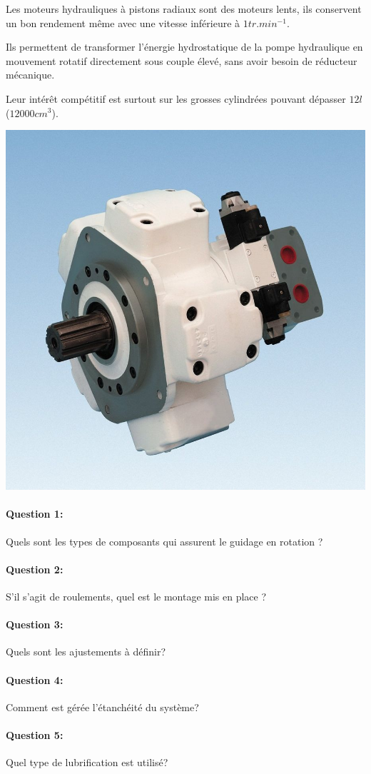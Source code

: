 \begin{minipage}{0.45\linewidth}
Les moteurs hydrauliques à pistons radiaux sont des moteurs lents, ils conservent un bon rendement même avec une vitesse inférieure à $1tr.min^{-1}$.

Ils permettent de transformer l'énergie hydrostatique de la pompe hydraulique en mouvement rotatif directement sous couple élevé, sans avoir besoin de réducteur mécanique.

Leur intérêt compétitif est surtout sur les grosses cylindrées pouvant dépasser $12l$ ($12 000cm^3$).
\end{minipage}
\hfill
\begin{minipage}{0.45\linewidth}
 \centering\includegraphics[width=0.8\linewidth]{img/moteur_pistons_radiaux.jpg}
\end{minipage}

\paragraph{Question 1:} Quels sont les types de composants qui assurent le guidage en rotation ?

\paragraph{Question 2:} S'il s'agit de roulements, quel est le montage mis en place ?

\paragraph{Question 3:} Quels sont les ajustements à définir?

\paragraph{Question 4:} Comment est gérée l'étanchéité du système?

\paragraph{Question 5:} Quel type de lubrification est utilisé?




